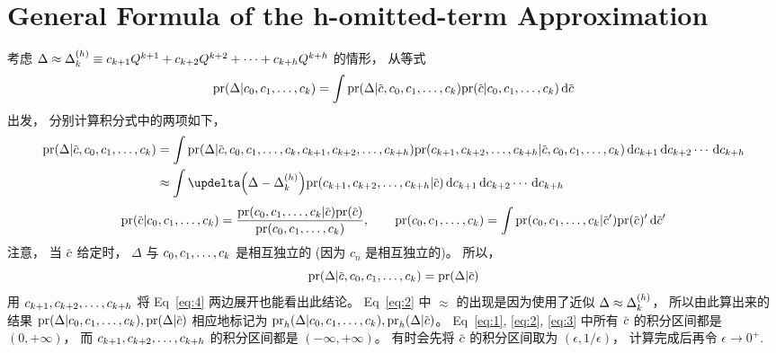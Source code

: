 
\section{General Formula of the h-omitted-term Approximation}
考虑 $\Delta\approx\Delta_k^{(h)}\equiv c_{k+1}Q^{k+1}+c_{k+2}Q^{k+2}+\cdots
+c_{k+h}Q^{k+h}$ 的情形，
从等式
\begin{equation}
  \label{eq:1}
  \dmspr (\Delta|\dmsccck)=
  \int \dmspr(\Delta|\dmscbar,\dmsccck)
  \dmspr(\dmscbar|\dmsccck)\dmsdif\dmscbar
\end{equation}
出发，
分别计算积分式中的两项如下，
\begin{equation}
  \label{eq:2}
  \begin{aligned}
    \dmspr(\Delta|\dmscbar,\dmsccck)
    &= \int \dmspr(\Delta|\dmscbar,\dmsccck,\dmsccch)
    \dmspr(\dmsccch|\dmscbar,\dmsccck)\dmsdifccch \\
    &\approx \int \updelta\Bigl(\Delta-\dmsdeltakh\Bigr)
    \dmspr(\dmsccch|\dmscbar)\dmsdifccch
  \end{aligned}
\end{equation}
\begin{equation}
  \label{eq:3}
    \dmspr(\dmscbar|\dmsccck)
    = \frac{\dmspr(\dmsccck|\dmscbar)\dmspr(\dmscbar)}{\dmspr(\dmsccck)},
    \qquad
    \dmspr(\dmsccck)=\int\dmspr(\dmsccck|\dmscbar^\prime)
    \dmspr(\dmscbar)^\prime\dmsdif\dmscbar^\prime
\end{equation}
注意，
当 $\dmscbar$ 给定时，
$\Delta$ 与 $c_0,c_1,\ldots,c_k$ 是相互独立的 (因为 $c_n$ 是相互独立的)。
所以，
\begin{equation}
  \label{eq:4}
  \dmspr(\Delta|\dmscbar,\dmsccck)=\dmspr(\Delta|\dmscbar)
\end{equation}
用 $c_{k+1},c_{k+2},\ldots,c_{k+h}$ 将 Eq~\eqref{eq:4} 两边展开也能看出此结论。
Eq~\eqref{eq:2} 中 $\approx$ 的出现是因为使用了近似
$\Delta\approx\Delta_k^{(h)}$，
所以由此算出来的结果 $\dmspr(\Delta|\dmsccck),\dmspr(\Delta|\dmscbar)$
相应地标记为 $\dmspr_h(\Delta|\dmsccck),\dmspr_h(\Delta|\dmscbar)$。
Eq~\eqref{eq:1}, \eqref{eq:2}, \eqref{eq:3} 中所有 $\dmscbar$ 的积分区间都是
 $(0,+\infty)$，
而 $c_{k+1},c_{k+2},\ldots,c_{k+h}$ 的积分区间都是 $(-\infty,+\infty)$。
有时会先将 $\dmscbar$ 的积分区间取为 $(\epsilon,1/\epsilon)$，
计算完成后再令 $\epsilon \to 0^+$.

